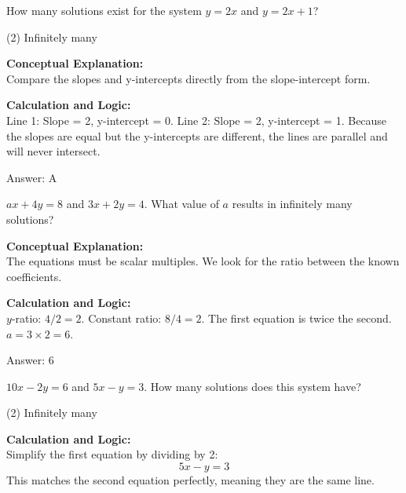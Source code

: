 \documentclass[11pt,paper=a4,answers]{exam}
\begin{document}
\begin{questions}
\question
How many solutions exist for the system $y = 2x$ and $y = 2x + 1$?
\begin{tasks}(2)
    \task Infinitely many
\end{tasks}

\begin{solution}
\textbf{Conceptual Explanation:} \\
Compare the slopes and y-intercepts directly from the slope-intercept form.

\vspace{10pt}
\textbf{Calculation and Logic:} \\
Line 1: Slope = 2, y-intercept = 0.
Line 2: Slope = 2, y-intercept = 1.
Because the slopes are equal but the y-intercepts are different, the lines are parallel and will never intersect.

\vspace{15pt}
Answer: \colorbox{yellow!100}{A}
\end{solution}

\question
$ax + 4y = 8$ and $3x + 2y = 4$. What value of $a$ results in infinitely many solutions?

\begin{solution}
\textbf{Conceptual Explanation:} \\
The equations must be scalar multiples. We look for the ratio between the known coefficients.

\vspace{10pt}
\textbf{Calculation and Logic:} \\
$y$-ratio: $4/2 = 2$.
Constant ratio: $8/4 = 2$.
The first equation is twice the second.
$a = 3 \times 2 = 6$.

\vspace{15pt}
Answer: \colorbox{yellow!100}{6}
\end{solution}

\question
$10x - 2y = 6$ and $5x - y = 3$. How many solutions does this system have?
\begin{tasks}(2)
    \task Infinitely many
\end{tasks}

\begin{solution}
\textbf{Calculation and Logic:} \\
Simplify the first equation by dividing by 2:
\[ 5x - y = 3 \]
This matches the second equation perfectly, meaning they are the same line.


\end{solution}
\end{questions}
\end{document}
